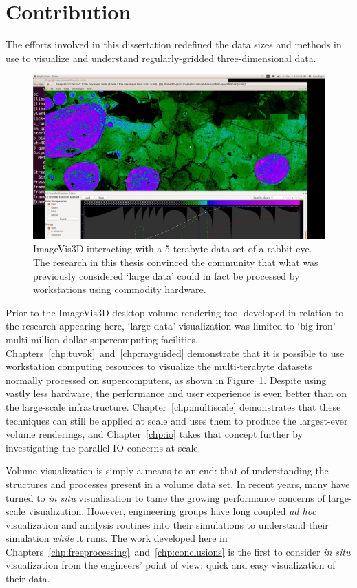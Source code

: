 \section{Contribution}

The efforts involved in this dissertation redefined the data sizes
and methods in use to visualize and understand regularly-gridded
three-dimensional data.

\begin{figure}
	\includegraphics[width=\linewidth]{images/rabbit5tb}

  \caption{ImageVis3D interacting with a 5 terabyte data set of a
  rabbit eye.  The research in this thesis convinced the community
  that what was previously considered `large data' could in fact be
  processed by workstations using commodity hardware.}

	\label{fig:rabbit5tb}
\end{figure}

Prior to the ImageVis3D desktop volume rendering tool developed in
relation to the research appearing here, `large data' visualization was
limited to `big iron' multi-million dollar supercomputing facilities.
Chapters~\ref{chp:tuvok}~and~\ref{chp:rayguided} demonstrate that it
is possible to use workstation computing resources to visualize the
multi-terabyte datasets normally processed on supercomputers, as shown in
Figure~\ref{fig:rabbit5tb}.  Despite
using vastly less hardware, the performance and user experience is even
better than on the large-scale infrastructure.
Chapter~\ref{chp:multiscale} demonstrates that these techniques can
still be applied at scale and uses them to produce the largest-ever
volume renderings, and Chapter~\ref{chp:io} takes that concept further
by investigating the parallel IO concerns at scale.

Volume visualization is simply a means to an end: that of understanding
the structures and processes present in a volume data set.  In recent
years, many have turned to \textit{in situ} visualization to tame the
growing performance concerns of large-scale visualization.  However,
engineering groups have long coupled \textit{ad hoc} visualization and
analysis routines into their simulations to understand their simulation
\emph{while} it runs.  The work developed here in
Chapters~\ref{chp:freeprocessing}~and~\ref{chp:conclusions} is the
first to consider
\textit{in situ} visualization from the engineers' point of view: quick
and easy visualization of their data.

